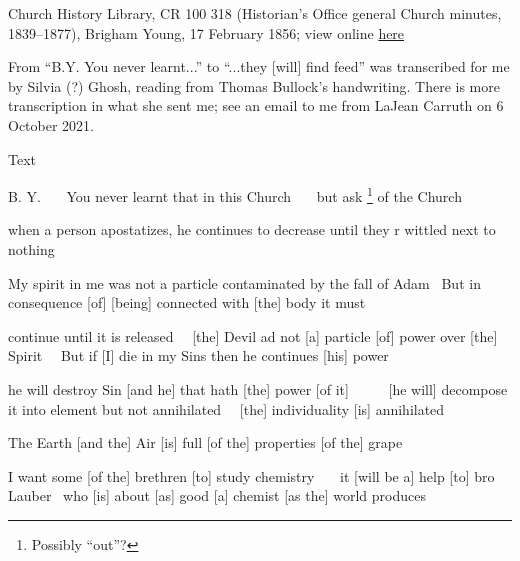 					Church History Library, CR 100 318 (Historian's Office general Church minutes, 1839--1877), Brigham Young, 17 February 1856; view online \href{https://catalog.churchofjesuschrist.org/assets/03adc166-a80a-4aa7-b441-9f3f4fa0b7f1/0/0}{here}
					
					From ``B.Y. You never learnt...'' to ``...they [will] find feed'' was transcribed for me by Silvia (?) Ghosh, reading from Thomas Bullock's handwriting. There is more transcription in what she sent me; see an email to me from LaJean Carruth on 6 October 2021.
				
				\begin{description}
					\item[Text]
				\end{description}
				
					B. Y. \ \ \ You never learnt that in this Church \ \ \ but ask%
						\footnote{%
							\label{EMS-1856-BY-17-FEB-1856-ask}%
							Possibly ``out''?
							}
					of the Church

					when a person apostatizes, he continues to decrease until they r wittled next to nothing

					My spirit in me was not a particle contaminated by the fall of Adam \ But in consequence [of] [being] connected with [the] body it must

					continue until it is released \ \ [the] Devil ad not [a] particle [of] power over [the] Spirit \ \ But if [I] die in my Sins then he continues [his] power

					he will destroy Sin [and he] that hath [the] power [of it] \ \ \ \ \ [he will] decompose it into element but not annihilated \ \ [the] individuality [is] annihilated

					The Earth [and the] Air [is] full [of the] properties [of the] grape

					I want some [of the] brethren [to] study chemistry \ \ \ it [will be a] help [to] bro Lauber \ who [is] about [as] good [a] chemist [as the] world produces

